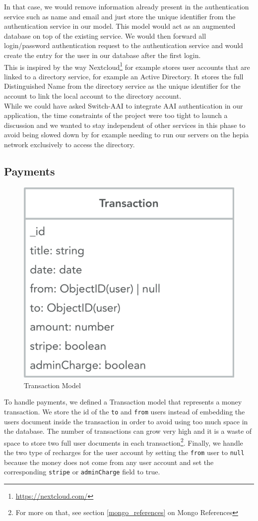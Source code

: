 \documentclass[twoside, openright,11pt,a4paper]{book}
\begin{document}
In that case, we would remove information already present in the authentication service such as name and email and just store the unique identifier from the authentication service in our model. This model would act as an augmented database on top of the existing service. We would then forward all login/password authentication request to the authentication service and would create the entry for the user in our database after the first login.\\

This is inspired by the way Nextcloud\footnote{\url{https://nextcloud.com/}} for example stores user accounts that are linked to a directory service, for example an Active Directory. It stores the full Distinguished Name from the directory service as the unique identifier for the account to link the local account to the directory account.\\

While we could have asked Switch-AAI to integrate AAI authentication in our application, the time constraints of the project were too tight to launch a discussion and we wanted to stay independent of other services in this phase to avoid being slowed down by for example needing to run our servers on the hepia network exclusively to access the directory.
\subsection{Payments}
\begin{figure}[H]
\begin{center}
	\includegraphics[width=.4\textwidth]{assets/transaction_model}
	\caption{Transaction Model}
\end{center}
\end{figure}
To handle payments, we defined a Transaction model that represents a money transaction. We store the id of the \verb+to+ and \verb+from+ users instead of embedding the users document inside the transaction in order to avoid using too much space in the database. The number of transactions can grow very high and it is a waste of space to store two full user documents in each transaction\footnote{For more on that, see section \ref{mongo_references} on Mongo References}. Finally, we handle the two type of recharges for the user account by setting the \verb+from+ user to \verb+null+ because the money does not come from any user account and set the corresponding \verb+stripe+ or \verb+adminCharge+ field to true. \\
\end{document}
